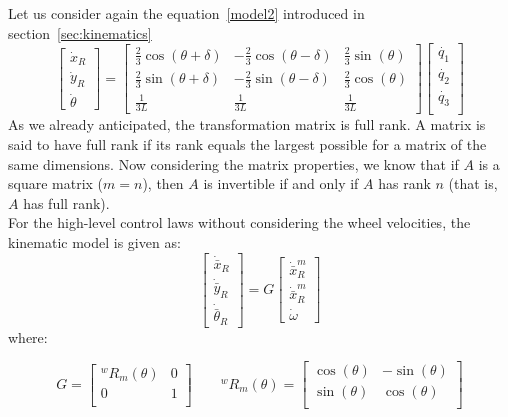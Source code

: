 Let us consider again the equation~\ref{model2} introduced in section~\ref{sec:kinematics}
\begin{equation*}
	\begin{bmatrix}
		\dot{x}_R\\
		\dot{y}_R\\
		\dot{\theta}
	\end{bmatrix} =
	\begin{bmatrix}
		\frac{2}{3}\cos(\theta+\delta) & -\frac{2}{3}\cos(\theta-\delta) & \frac{2}{3}\sin(\theta)\\
		\frac{2}{3}\sin(\theta+\delta) & -\frac{2}{3}\sin(\theta-\delta) & \frac{2}{3}\cos(\theta)\\
		\frac{1}{3L} & \frac{1}{3L} & \frac{1}{3L}
	\end{bmatrix}
	\begin{bmatrix}
		\dot{q_1}\\
		\dot{q_2}\\
		\dot{q_3}\\
	\end{bmatrix}	
\end{equation*}
As we already anticipated, the transformation matrix is full rank. A matrix is said to have full rank if its rank equals the largest possible for a matrix of the same dimensions. Now considering the matrix properties, we know that if $A$ is a square matrix ($m = n$), then $A$ is invertible if and only if $A$ has rank $n$ (that is, $A$ has full rank).\\
For the high-level control laws without considering the wheel velocities, the kinematic model is given as:
\begin{equation}
\begin{bmatrix}
\dot{\bar{x}}_R\\
\dot{\bar{y}}_R\\
\dot{\bar{\theta}}_R
\end{bmatrix}
= G
\begin{bmatrix}
\dot{\bar{x}}_R^m\\
\dot{\bar{x}}_R^m\\
\dot{\omega}
\end{bmatrix}
\label{eq:control_law}
\end{equation}
where:

\begin{equation}
G=\begin{bmatrix}
^wR_m(\theta) & 0\\
0 & 1\\
\end{bmatrix}\qquad
^wR_m(\theta)=\begin{bmatrix}
\cos(\theta) &-\sin(\theta)\\
\sin(\theta) & \cos(\theta)\\
\end{bmatrix}
\end{equation}

